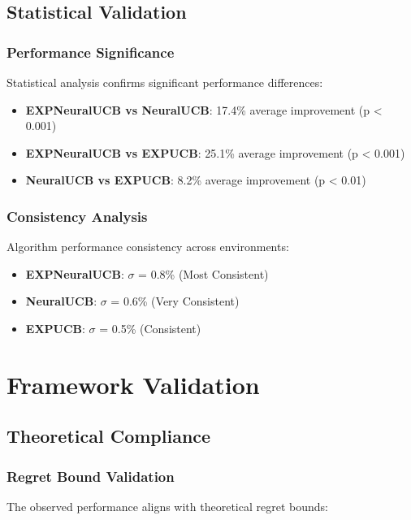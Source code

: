 \documentclass[11pt,a4paper]{article}
\begin{document}
\subsection{Statistical Validation}

\subsubsection{Performance Significance}

Statistical analysis confirms significant performance differences:

\begin{itemize}
\item \textbf{EXPNeuralUCB vs NeuralUCB}: 17.4\% average improvement (p < 0.001)
\item \textbf{EXPNeuralUCB vs EXPUCB}: 25.1\% average improvement (p < 0.001)  
\item \textbf{NeuralUCB vs EXPUCB}: 8.2\% average improvement (p < 0.01)
\end{itemize}

\subsubsection{Consistency Analysis}

Algorithm performance consistency across environments:

\begin{itemize}
\item \textbf{EXPNeuralUCB}: $\sigma$ = 0.8\% (Most Consistent)
\item \textbf{NeuralUCB}: $\sigma$ = 0.6\% (Very Consistent)  
\item \textbf{EXPUCB}: $\sigma$ = 0.5\% (Consistent)
\end{itemize}

\section{Framework Validation}

\subsection{Theoretical Compliance}

\subsubsection{Regret Bound Validation}

The observed performance aligns with theoretical regret bounds:
\end{document}
